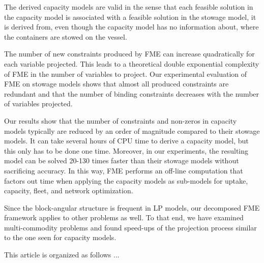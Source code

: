 The derived capacity models are valid in the sense that each feasible solution in the capacity model is associated with a feasible solution in the stowage model, it is derived from, even though the capacity model has no information about, where the containers are stowed on the vessel. 

The number of new constraints produced by FME can increase quadratically       for each variable projected. This leads to a theoretical double exponential complexity of FME in the number of variables to project. Our experimental evaluation of FME on stowage models shows that almost all produced constraints are redundant and that the number of binding constraints decreases with the number of variables projected. 

Our results show that the number of constraints and non-zeros in capacity models typically are reduced by an order of magnitude compared to their stowage models. It can take several hours of CPU time to derive a capacity model, but this only has to be done one time. Moreover, in our experiments, the resulting model can be solved 20-130 times faster than their stowage models without sacrificing accuracy. In this way, FME performs an off-line computation that factors out time when applying the capacity models as sub-models for uptake, capacity, fleet, and network optimization.

Since the block-angular structure is frequent in LP models, our decomposed FME framework applies to other problems as well. To that end, we have examined multi-commodity problems and found speed-ups of the projection process similar to the one seen for capacity models.

This article is organized as follows ...

%
